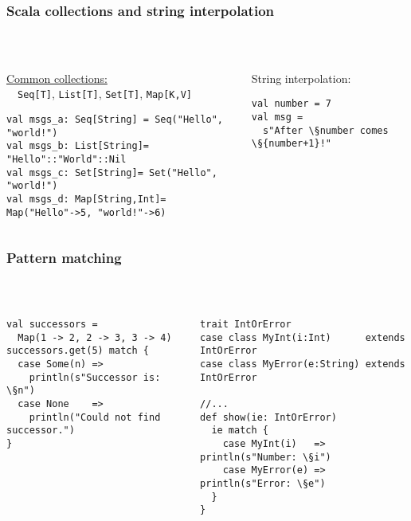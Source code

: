 \documentclass[aspectratio=169]{beamer}
\begin{document}
\begin{frame}[fragile]\frametitle{Scala collections and string interpolation}
~\\[-8mm]
\begin{columns}
\begin{column}{0.46\textwidth}
\href{https://docs.scala-lang.org/overviews/collections-2.13/performance-characteristics.html}{Common collections:}
\\~~\texttt{Seq[T]}, \texttt{List[T]}, \texttt{Set[T]}, \texttt{Map[K,V]}  
\begin{lstlisting}
val msgs_a: Seq[String] = Seq("Hello", "world!")
val msgs_b: List[String]= "Hello"::"World"::Nil
val msgs_c: Set[String]= Set("Hello", "world!")
val msgs_d: Map[String,Int]= Map("Hello"->5, "world!"->6)
\end{lstlisting}
\end{column}
\begin{column}{0.52\textwidth}
String interpolation:
\begin{lstlisting}
val number = 7
val msg =
  s"After \§number comes \§{number+1}!"
\end{lstlisting}
\end{column}
\end{columns}
\end{frame}


\begin{frame}[fragile]\frametitle{Pattern matching}
~\\[-8mm]
\begin{columns}
\begin{column}{0.56\textwidth}
\begin{lstlisting}
val successors =
  Map(1 -> 2, 2 -> 3, 3 -> 4)
successors.get(5) match {
  case Some(n) =>
    println(s"Successor is: \§n")
  case None    =>
    println("Could not find successor.")
}
\end{lstlisting}
\end{column}
\begin{column}{0.42\textwidth}
\begin{lstlisting}
trait IntOrError
case class MyInt(i:Int)      extends IntOrError
case class MyError(e:String) extends IntOrError

//...
def show(ie: IntOrError)
  ie match {
    case MyInt(i)   => println(s"Number: \§i")
    case MyError(e) => println(s"Error: \§e")
  }
}
\end{lstlisting}
\end{column}
\end{columns}
\end{frame}
\end{document}
